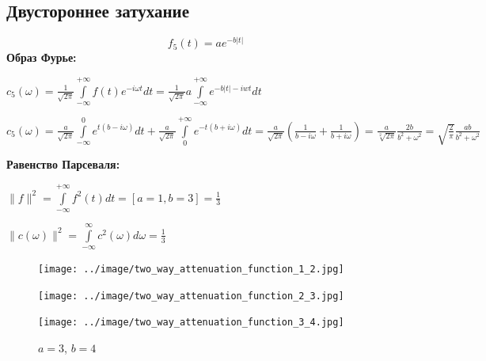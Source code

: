   \subsection{Двустороннее затухание}
  \[
  f_5(t) = 
    a e^{-b|t|}
  \]
  \textbf{Образ Фурье:}  \\
  \begin{center}
    $c_5(\omega) = \frac{1}{\sqrt{2\pi}} \int\limits_{-\infty}^{+\infty}f(t)e^{-i\omega t}dt = 
  \frac{1}{\sqrt{2\pi}} a \int\limits_{-\infty}^{+\infty} e^{-b|t| - iwt}dt  
  $ 
  \end{center} 
  \begin{center}
  $c_5(\omega) = 
  \frac{a}{\sqrt{2\pi}} \int\limits_{-\infty}^{0}e^{t(b - i\omega)}dt + \frac{a}{\sqrt{2 \pi}} \int\limits_{0}^{+\infty} e^{-t(b + i \omega)}dt=
  \frac{a}{\sqrt{2 \pi}}(\frac{1}{b-i\omega} + \frac{1}{b+i\omega}) = \frac{a}{\sqrt[2]{2 \pi}}\frac{2b}{b^2 + \omega^2} = 
  \sqrt{\frac{2}{\pi}}\frac{ab}{b^2+\omega^2}
  $
  \end{center}
  \noindent \textbf{Равенство Парсеваля:}
  \begin{center}
    $\parallel f \parallel^2 = \int\limits_{-\infty}^{+\infty} f^2(t) dt= [a = 1, b = 3] = \frac{1}{3}  $
  \end{center}
  \begin{center}
    $\parallel c(\omega)\parallel^ 2 = \int\limits_{-\infty}^{\infty}c^2(\omega)d\omega = \frac{1}{3}$
  \end{center}
  \begin{figure}[!htb]
      \texttt{[image: ../image/two\_way\_attenuation\_function\_1\_2.jpg]}
      \caption{$a=1$, $b=2$}
    \endminipage\hfill
      \texttt{[image: ../image/two\_way\_attenuation\_function\_2\_3.jpg]}
      \caption{$a = 2$, $b = 3$}
    \endminipage\hfill
      \texttt{[image: ../image/two\_way\_attenuation\_function\_3\_4.jpg]}
      \caption{$a = 3$, $b = 4$}
    \endminipage
    \end{figure}
